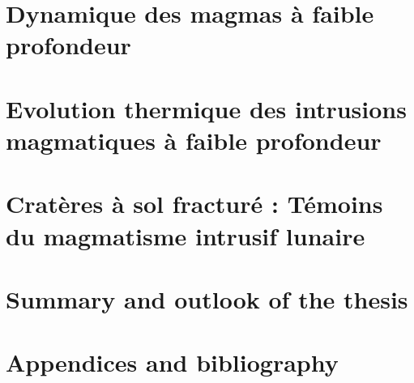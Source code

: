 \documentclass[a4paper,12pt,twoside]{ThesisStyle}
\begin{document}


\dominitoc
\setcounter{tocdepth}{2}

\cleardoublepage



\cleardoublepage




\tableofcontents

\mainmatter
\part{Dynamique des magmas à faible profondeur}

\pagestyle{fancy}




\part{Evolution   thermique  des   intrusions  magmatiques   à  faible
  profondeur}




\part{Cratères à sol fracturé : Témoins du magmatisme intrusif lunaire}


 

\part{Summary and outlook of the thesis}





\part{Appendices and bibliography}

\appendix







\printnomenclature



\end{document}
